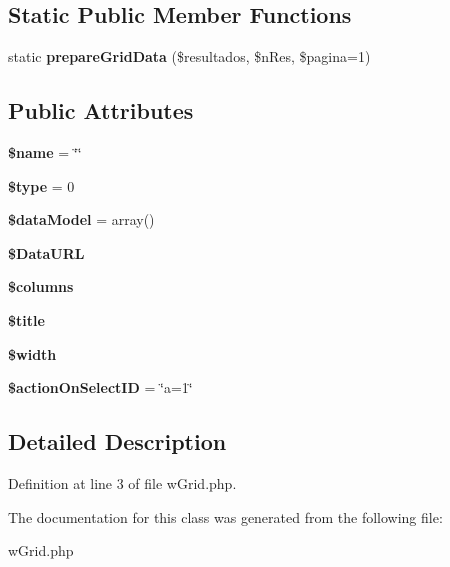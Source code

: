 \subsection*{Static Public Member Functions}
\begin{DoxyCompactItemize}
\item 
\hypertarget{classwGrid_a28f16946248bc8fdc240234f4d9531e0}{
static {\bfseries prepareGridData} (\$resultados, \$nRes, \$pagina=1)}
\label{classwGrid_a28f16946248bc8fdc240234f4d9531e0}

\end{DoxyCompactItemize}
\subsection*{Public Attributes}
\begin{DoxyCompactItemize}
\item 
\hypertarget{classwGrid_aec5c20eab9f71c8cbd2c7010061dd6f2}{
{\bfseries \$name} = \char`\"{}\char`\"{}}
\label{classwGrid_aec5c20eab9f71c8cbd2c7010061dd6f2}

\item 
\hypertarget{classwGrid_a0a49e2985d586e7ec5d31b3d5a71c8fd}{
{\bfseries \$type} = 0}
\label{classwGrid_a0a49e2985d586e7ec5d31b3d5a71c8fd}

\item 
\hypertarget{classwGrid_ab86f1ebf27b016652b711ffb97079dea}{
{\bfseries \$dataModel} = array()}
\label{classwGrid_ab86f1ebf27b016652b711ffb97079dea}

\item 
\hypertarget{classwGrid_ae44802db87dacddace57515a28d47cda}{
{\bfseries \$DataURL}}
\label{classwGrid_ae44802db87dacddace57515a28d47cda}

\item 
\hypertarget{classwGrid_a0457cd26d2357e132a3fd7cebf679967}{
{\bfseries \$columns}}
\label{classwGrid_a0457cd26d2357e132a3fd7cebf679967}

\item 
\hypertarget{classwGrid_ab9e7d668bf54e132059a93d12965bc62}{
{\bfseries \$title}}
\label{classwGrid_ab9e7d668bf54e132059a93d12965bc62}

\item 
\hypertarget{classwGrid_a8322680e99fd7e35572b49720ed849da}{
{\bfseries \$width}}
\label{classwGrid_a8322680e99fd7e35572b49720ed849da}

\item 
\hypertarget{classwGrid_a78c1d8b21816659cb25f274b5fcfa88e}{
{\bfseries \$actionOnSelectID} = \char`\"{}a=1\char`\"{}}
\label{classwGrid_a78c1d8b21816659cb25f274b5fcfa88e}

\end{DoxyCompactItemize}


\subsection{Detailed Description}


Definition at line 3 of file wGrid.php.



The documentation for this class was generated from the following file:\begin{DoxyCompactItemize}
\item 
wGrid.php\end{DoxyCompactItemize}
